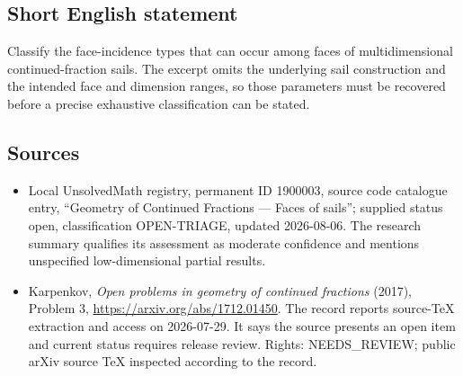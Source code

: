 \documentclass[11pt]{article}
\begin{document}
\subsection{Short English statement}
Classify the face-incidence types that can occur among faces of multidimensional continued-fraction sails. The excerpt omits the underlying sail construction and the intended face and dimension ranges, so those parameters must be recovered before a precise exhaustive classification can be stated.
\subsection{Sources}
\begin{itemize}
\item Local UnsolvedMath registry, permanent ID 1900003, source code catalogue entry, ``Geometry of Continued Fractions --- Faces of sails''; supplied status open, classification OPEN-TRIAGE, updated 2026-08-06. The research summary qualifies its assessment as moderate confidence and mentions unspecified low-dimensional partial results.
\item Karpenkov, \emph{Open problems in geometry of continued fractions} (2017), Problem 3, \url{https://arxiv.org/abs/1712.01450}. The record reports source-TeX extraction and access on 2026-07-29. It says the source presents an open item and current status requires release review. Rights: NEEDS\_REVIEW; public arXiv source TeX inspected according to the record.
\end{itemize}
\end{document}
